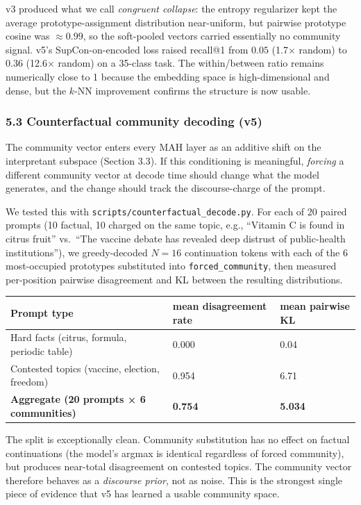 \documentclass[
  11pt]{article}
\newcounter{none} %
\begin{document}
v3 produced what we call \emph{congruent collapse}: the entropy
regularizer kept the average prototype-assignment distribution
near-uniform, but pairwise prototype cosine was \(\approx 0.99\), so the
soft-pooled vectors carried essentially no community signal. v5's
SupCon-on-encoded loss raised recall@1 from \(0.05\) (1.7\(\times\)
random) to \(0.36\) (12.6\(\times\) random) on a 35-class task. The
within/between ratio remains numerically close to 1 because the
embedding space is high-dimensional and dense, but the \(k\)-NN
improvement confirms the structure is now usable.

\subsubsection{5.3 Counterfactual community decoding
(v5)}\label{counterfactual-community-decoding-v5}

The community vector enters every MAH layer as an additive shift on the
interpretant subspace (Section 3.3). If this conditioning is meaningful,
\emph{forcing} a different community vector at decode time should change
what the model generates, and the change should track the
discourse-charge of the prompt.

We tested this with \texttt{scripts/counterfactual\_decode.py}. For each
of 20 paired prompts (10 factual, 10 charged on the same topic, e.g.,
``Vitamin C is found in citrus fruit'' vs.~``The vaccine debate has
revealed deep distrust of public-health institutions''), we
greedy-decoded \(N = 16\) continuation tokens with each of the 6
most-occupied prototypes substituted into \texttt{forced\_community},
then measured per-position pairwise disagreement and KL between the
resulting distributions.

{\def\LTcaptype{none} %
\begin{longtable}[]{@{}lll@{}}
\toprule\noalign{}
Prompt type & mean disagreement rate & mean pairwise KL \\
\midrule\noalign{}
\endhead
\bottomrule\noalign{}
\endlastfoot
Hard facts (citrus, formula, periodic table) & 0.000 & 0.04 \\
Contested topics (vaccine, election, freedom) & 0.954 & 6.71 \\
\textbf{Aggregate (20 prompts × 6 communities)} & \textbf{0.754} &
\textbf{5.034} \\
\end{longtable}
}

The split is exceptionally clean. Community substitution has no effect
on factual continuations (the model's argmax is identical regardless of
forced community), but produces near-total disagreement on contested
topics. The community vector therefore behaves as a \emph{discourse
prior}, not as noise. This is the strongest single piece of evidence
that v5 has learned a usable community space.
\end{document}
